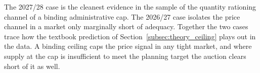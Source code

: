 The 2027/28 case is the cleanest evidence in the sample of the
quantity rationing channel of a binding administrative cap. The
2026/27 case isolates the price channel in a market only marginally
short of adequacy. Together the two cases trace how the textbook prediction of
Section~\ref{subsec:theory_ceiling} plays out in the data. A binding
ceiling caps the price signal in any tight market, and where supply
at the cap is insufficient to meet the planning target the auction
clears short of it as well.

